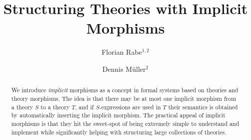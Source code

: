\documentclass[orivec]{llncs}
\begin{document}
\title{Structuring Theories with Implicit Morphisms}
\author{Florian Rabe$^{1,2}$ \and Dennis M\"uller$^2$}
\maketitle

\begin{abstract}
We introduce \emph{implicit} morphisms as a concept in formal systems based on theories and theory morphisms.
The idea is that there may be at most one implicit morphism from a theory $S$ to a theory $T$, and if $S$-expressions are used in $T$ their semantics is obtained by automatically inserting the implicit morphism.
The practical appeal of implicit morphisms is that they hit the sweet-spot of being extremely simple to understand and implement while significantly helping with structuring large collections of theories.
\end{abstract}




\end{document}
